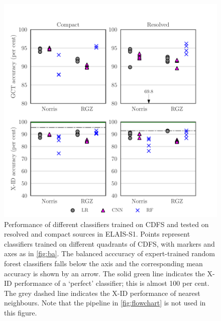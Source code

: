 \documentclass[fleqn,usenatbib,usedcolumn]{mnras}
\begin{document}
  \begin{figure}
  \centering
  \includegraphics[width=\columnwidth]{images/elais-grid-new.pdf}
  \caption{Performance of different classifiers trained on CDFS and tested on resolved and compact sources in ELAIS-S1. Points represent classifiers trained on different quadrants of CDFS, with markers and axes as in \autoref{fig:ba}. The balanced acccuracy of expert-trained random forest classifiers falls below the axis and the corresponding mean accuracy is shown by an arrow. The solid green line indicates the X-ID performance of a `perfect' classifier; this is almost 100 per cent. The grey dashed line indicates the X-ID performance of nearest neighbours. Note that the pipeline in \autoref{fig:flowchart} is not used in this figure.
    \label{fig:elais-ba}}
  \end{figure}
\end{document}
